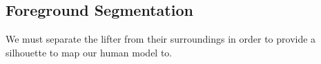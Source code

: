 \subsection{Foreground Segmentation}

We must separate the lifter from their surroundings in order to provide a silhouette to map our human model to.


%